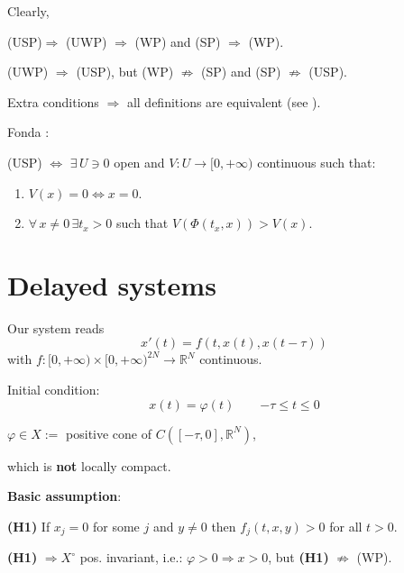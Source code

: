 \documentclass[spanish]{beamer}
\newcommand{\R}{{\mathbb{R}}}
\def \le{\leqslant}
\begin{document}
\begin{frame}{}



Clearly, 

\begin{center}
    (USP)$\Longrightarrow$ (UWP) $\Longrightarrow$ (WP) and
(SP) $ \Longrightarrow$ (WP).
\end{center}



\begin{center}
    
(UWP) $\Longrightarrow$ (USP), but 
(WP) $\not\Longrightarrow$ (SP)
and 
(SP) $\not\Longrightarrow$ (USP). 
\end{center}

Extra conditions $\Longrightarrow$  all definitions are equivalent (see \cite{FM}).

   \smallskip 
\pause  
Fonda \cite{F}:
   \smallskip 
    
    (USP) $\Longleftrightarrow$
        $\exists \, U\ni 0$ open and $V:U\to [0,+\infty)$ continuous such that: 
        \begin{enumerate}
            \item $V(x)=0 \iff x=0$.
            \item $\forall\, x\ne 0\, \exists t_x>0$ such that $V(\Phi(t_x,x)) > V(x)$. 
        \end{enumerate}
\end{frame}

\section{Delayed systems}

\begin{frame}
    
  

Our system reads
\begin{equation}
\label{eq}
x'(t)=f(t,x(t),x(t-\tau))
\end{equation}
with
$f:[0,+\infty)\times [0,+\infty)^{2N}\to \R^N$  continuous.

Initial condition:
\begin{equation}
\label{ic}
x(t) =\varphi(t)
\qquad {-\tau\le t\le 0}
\end{equation}
\begin{center}
    $\varphi\in X:=$ positive cone of $C([-\tau,0],\R^N)$,
\end{center}
which is \textbf{not} locally compact. 

\medskip 

{\bf Basic assumption}: 

\smallskip

{\bf (H1)} \label{posit}
If $x_j=0$ for some $j$ and $y\ne 0$ then $f_j(t,x,y)>0$ for all $t>0$.

\pause 
\bigskip
{\bf (H1)} $\Longrightarrow X^\circ$ pos.  invariant, i.e.: $\varphi>0\Longrightarrow x>0$, but {\bf (H1)} $\not\Longrightarrow$ (WP). 

\end{frame}
\end{document}
